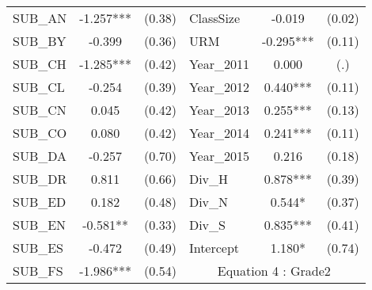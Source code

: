 \begin{table}[htb]
\begin{threeparttable}
\begin{tabular}{l c c|l c c }
    SUB\_AN                                      & -1.257***                  & (0.38)               & ClassSize           & -0.019                 & (0.02)               \\
    SUB\_BY                                      & -0.399                     & (0.36)               & URM                 & -0.295***              & (0.11)               \\
    SUB\_CH                                      & -1.285***                  & (0.42)               & Year\_2011               & 0.000                  & (.)                  \\
    SUB\_CL                                      & -0.254                     & (0.39)               & Year\_2012               & 0.440***               & (0.11)               \\
    SUB\_CN                                      & 0.045                      & (0.42)               & Year\_2013               & 0.255***               & (0.13)               \\
    SUB\_CO                                      & 0.080                      & (0.42)               & Year\_2014               & 0.241***               & (0.11)               \\
    SUB\_DA                                      & -0.257                     & (0.70)               & Year\_2015               & 0.216                  & (0.18)               \\
    SUB\_DR                                      & 0.811                      & (0.66)               & Div\_H              & 0.878***               & (0.39)               \\
    SUB\_ED                                      & 0.182                      & (0.48)               & Div\_N              & 0.544*                 & (0.37)               \\
    SUB\_EN                                      & -0.581**                   & (0.33)               & Div\_S              & 0.835***               & (0.41)               \\
    SUB\_ES                                      & -0.472                     & (0.49)               & Intercept           & 1.180*                 & (0.74)               \\
    \cline{4-6}
    SUB\_FS                                      & -1.986***                  & (0.54)               & \multicolumn{3}{c}{Equation 4 : Grade2}                             \\

\end{tabular}
\end{threeparttable}
\end{table}
